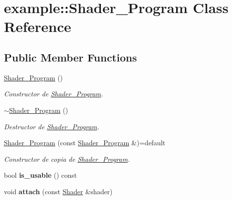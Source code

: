 \hypertarget{classexample_1_1_shader___program}{}\section{example\+::Shader\+\_\+\+Program Class Reference}
\label{classexample_1_1_shader___program}
\subsection*{Public Member Functions}
\begin{DoxyCompactItemize}
\item 
\mbox{\hyperlink{classexample_1_1_shader___program_aa76001651ab84fda3d899a2b57f2a4b3}{Shader\+\_\+\+Program}} ()
\begin{DoxyCompactList}\small\item\em Constructor de \mbox{\hyperlink{classexample_1_1_shader___program}{Shader\+\_\+\+Program}}. \end{DoxyCompactList}\item 
\mbox{\hyperlink{classexample_1_1_shader___program_a39b461d067ffc3a10662e1d4fcb6d689}{$\sim$\+Shader\+\_\+\+Program}} ()
\begin{DoxyCompactList}\small\item\em Destructor de \mbox{\hyperlink{classexample_1_1_shader___program}{Shader\+\_\+\+Program}}. \end{DoxyCompactList}\item 
\mbox{\hyperlink{classexample_1_1_shader___program_a94cce35e866d39287ee503150b262b6d}{Shader\+\_\+\+Program}} (const \mbox{\hyperlink{classexample_1_1_shader___program}{Shader\+\_\+\+Program}} \&)=default
\begin{DoxyCompactList}\small\item\em Constructor de copia de \mbox{\hyperlink{classexample_1_1_shader___program}{Shader\+\_\+\+Program}}. \end{DoxyCompactList}\item 
\mbox{\label{classexample_1_1_shader___program_ae76d165cf329883dfc287b37ecc313c2}} 
bool {\bfseries is\+\_\+usable} () const
\item 
\mbox{\label{classexample_1_1_shader___program_ab4b58aa69e6a4afc44e63a660b0e59b0}} 
void {\bfseries attach} (const \mbox{\hyperlink{classexample_1_1_shader}{Shader}} \&shader)
\item 

\end{DoxyCompactItemize}
